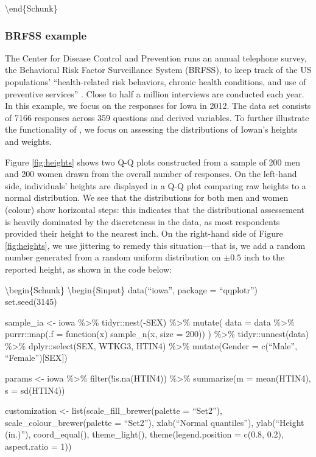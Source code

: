 \textbackslash{}end\{Schunk\}

\hypertarget{brfss-example}{%
\subsubsection{BRFSS example}\label{brfss-example}}

\label{sec:brfss}

The Center for Disease Control and Prevention runs an annual telephone
survey, the Behavioral Risk Factor Surveillance System (BRFSS), to keep
track of the US populations' ``health-related risk behaviors, chronic
health conditions, and use of preventive services'' \citep{brfss}. Close
to half a million interviews are conducted each year. In this example,
we focus on the responses for Iowa in 2012. The data set consists of
7166 responses across 359 questions and derived variables. To further
illustrate the functionality of , we focus on assessing the
distributions of Iowan's heights and weights.

Figure \ref{fig:heights} shows two Q-Q plots constructed from a sample
of 200 men and 200 women drawn from the overall number of responses. On
the left-hand side, individuals' heights are displayed in a Q-Q plot
comparing raw heights to a normal distribution. We see that the
distributions for both men and women (colour) show horizontal steps:
this indicates that the distributional assessement is heavily dominated
by the discreteness in the data, as most respondents provided their
height to the nearest inch. On the right-hand side of Figure
\ref{fig:heights}, we use jittering to remedy this situation---that is,
we add a random number generated from a random uniform distribution on
\(\pm 0.5\) inch to the reported height, as shown in the code below:

\textbackslash{}begin\{Schunk\} \textbackslash{}begin\{Sinput\}
data(``iowa'', package = ``qqplotr'') set.seed(3145)

sample\_ia \textless{}- iowa \%\textgreater{}\% tidyr::nest(-SEX)
\%\textgreater{}\% mutate( data = data \%\textgreater{}\% purrr::map(.f
= function(x) sample\_n(x, size = 200)) ) \%\textgreater{}\%
tidyr::unnest(data) \%\textgreater{}\% dplyr::select(SEX, WTKG3, HTIN4)
\%\textgreater{}\% mutate(Gender = c(``Male'', ``Female''){[}SEX{]})

params \textless{}- iowa \%\textgreater{}\% filter(!is.na(HTIN4))
\%\textgreater{}\% summarize(m = mean(HTIN4), s = sd(HTIN4))

customization \textless{}- list(scale\_fill\_brewer(palette = ``Set2''),
scale\_colour\_brewer(palette = ``Set2''), xlab(``Normal quantiles''),
ylab(``Height (in.)''), coord\_equal(), theme\_light(),
theme(legend.position = c(0.8, 0.2), aspect.ratio = 1))


